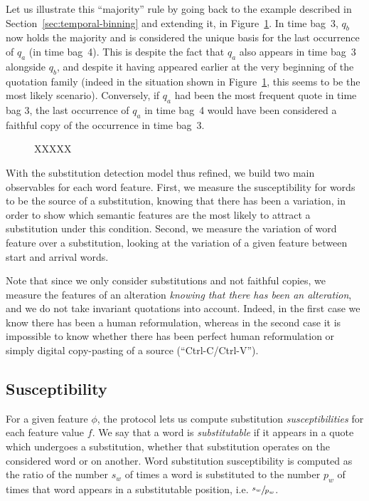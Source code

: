 Let us illustrate this ``majority'' rule by going back to the example described in Section~\ref{sec:temporal-binning} and extending it, in Figure~\ref{fig:substitution-q_max}.
In time bag~3, $q_b$ now holds the majority and is considered the unique basis for the last occurrence of $q_a$ (in time bag~4).
This is despite the fact that $q_a$ also appears in time bag~3 alongside $q_b$, and despite it having appeared earlier at the very beginning of the quotation family (indeed in the situation shown in Figure~\ref{fig:substitution-q_max}, this seems to be the most likely scenario).
Conversely, if $q_a$ had been the most frequent quote in time bag 3, the last occurrence of $q_a$ in time bag~4 would have been considered a faithful copy of the occurrence in time bag~3.

\begin{figure}[h]
    \centering
    \def\svgwidth{\linewidth}
    \small
    
    \caption{XXXXX}
    \label{fig:substitution-q_max}
\end{figure}

With the substitution detection model thus refined, we build two main observables for each word feature.
First, we measure the susceptibility for words to be the source of a substitution, knowing that there has been a variation, in order to show which semantic features are the most likely to attract a substitution under this condition.
Second, we measure the variation of word feature over a substitution, looking at the variation of a given feature between start and arrival words.

Note that since we only consider substitutions and not faithful copies, we measure the features of an alteration \emph{knowing that there has been an alteration}, and we do not take invariant quotations into account.
Indeed, in the first case we know there has been a human reformulation, whereas in the second case it is impossible to know whether there has been perfect human reformulation or simply digital copy-pasting of a source (``{\sc Ctrl-C}/{\sc Ctrl-V}'').

\subsection{Susceptibility}

For a given feature $\phi$, the protocol lets us compute substitution \emph{susceptibilities} for each feature value $f$.
We say that a word is \emph{substitutable} if it appears in a quote which undergoes a substitution, whether that substitution operates on the considered word or on another.
Word substitution susceptibility is computed as the ratio of the number $s_w$ of times a word is substituted to the number $p_w$ of times that word appears in a substitutable position, i.e. $\sfrac{s_w}{p_w}$.

